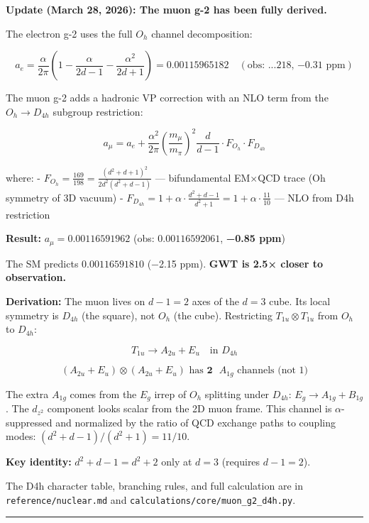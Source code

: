 \documentclass[
]{article}
\begin{document}
\textbf{Update (March 28, 2026): The muon g-2 has been fully derived.}

The electron g-2 uses the full \(O_h\) channel decomposition:

\[a_e = \frac{\alpha}{2\pi}\left(1 - \frac{\alpha}{2d-1} - \frac{\alpha^2}{2d+1}\right) = 0.00115965182 \quad (\text{obs: ...218, } {-0.31 \text{ ppm}})\]

The muon g-2 adds a hadronic VP correction with an NLO term from the
\(O_h \to D_{4h}\) subgroup restriction:

\[a_\mu = a_e + \frac{\alpha^2}{2\pi}\left(\frac{m_\mu}{m_\pi}\right)^2 \frac{d}{d-1} \cdot F_{O_h} \cdot F_{D_{4h}}\]

where: -
\(F_{O_h} = \frac{169}{198} = \frac{(d^2+d+1)^2}{2d^2(d^2+d-1)}\) ---
bifundamental EM×QCD trace (Oh symmetry of 3D vacuum) -
\(F_{D_{4h}} = 1 + \alpha \cdot \frac{d^2+d-1}{d^2+1} = 1 + \alpha \cdot \frac{11}{10}\)
--- NLO from D4h restriction

\textbf{Result:} \(a_\mu = 0.00116591962\) (obs: \(0.00116592061\),
\textbf{−0.85 ppm})

The SM predicts \(0.00116591810\) (−2.15 ppm). \textbf{GWT is 2.5×
closer to observation.}

\textbf{Derivation:} The muon lives on \(d-1 = 2\) axes of the \(d=3\)
cube. Its local symmetry is \(D_{4h}\) (the square), not \(O_h\) (the
cube). Restricting \(T_{1u} \otimes T_{1u}\) from \(O_h\) to \(D_{4h}\):

\[T_{1u} \to A_{2u} + E_u \quad \text{in } D_{4h}\]

\[(A_{2u} + E_u) \otimes (A_{2u} + E_u) \text{ has } \textbf{2} \text{ } A_{1g} \text{ channels (not 1)}\]

The extra \(A_{1g}\) comes from the \(E_g\) irrep of \(O_h\) splitting
under \(D_{4h}\): \(E_g \to A_{1g} + B_{1g}\). The \(d_{z^2}\) component
looks scalar from the 2D muon frame. This channel is
\(\alpha\)-suppressed and normalized by the ratio of QCD exchange paths
to coupling modes: \((d^2+d-1)/(d^2+1) = 11/10\).

\textbf{Key identity:} \(d^2+d-1 = d^2+2\) only at \(d=3\) (requires
\(d-1=2\)).

The D4h character table, branching rules, and full calculation are in
\texttt{reference/nuclear.md} and
\texttt{calculations/core/muon\_g2\_d4h.py}.

\begin{center}\rule{0.5\linewidth}{0.5pt}\end{center}
\end{document}
